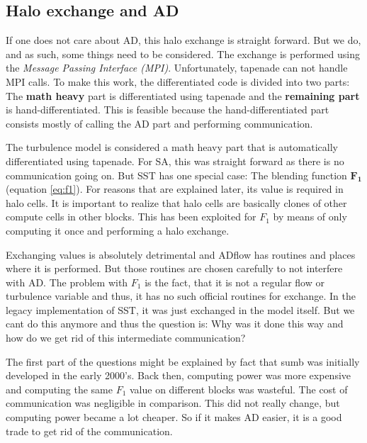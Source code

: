 \subsection{Halo exchange and AD}
If one does not care about AD, this halo exchange is straight forward. But we
do, and as such, some things need to be considered. The exchange is performed
using the \textit{Message Passing Interface (MPI)}. Unfortunately, tapenade can
not handle MPI calls. To make this work, the differentiated code is divided
into two parts: The \textbf{math heavy} part is differentiated using tapenade
and the \textbf{remaining part} is hand-differentiated. This is feasible
because the hand-differentiated part consists mostly of calling the AD part and
performing communication. 

The turbulence model is considered a math heavy part that is automatically
differentiated using tapenade. For SA, this was straight forward as there is no
communication going on. But SST has one special case: The blending function
$\mathbf{F_1}$ (equation \ref{eq:f1}). For reasons that are explained later,
its value is required in halo cells. It is important to realize that halo cells
are basically clones of other compute cells in other blocks. This has been
exploited for $F_1$ by means of only computing it once and performing a halo
exchange.

Exchanging values is absolutely detrimental and ADflow has routines and places
where it is performed. But those routines are chosen carefully to not
interfere with AD. The problem with $F_1$ is the fact, that it is not a regular
flow or turbulence variable and thus, it has no such official routines for
exchange. In the legacy implementation of SST, it was just exchanged in the
model itself. But we cant do this anymore and thus the question is: Why was it
done this way and how do we get rid of this intermediate communication?

The first part of the questions might be explained by fact that sumb was
initially developed in the early 2000's. Back then, computing power was more
expensive and computing the same $F_1$ value on different blocks was
wasteful. The cost of communication was negligible in comparison. This did not
really change, but computing power became a lot cheaper. So if it makes AD
easier, it is a good trade to get rid of the communication.








